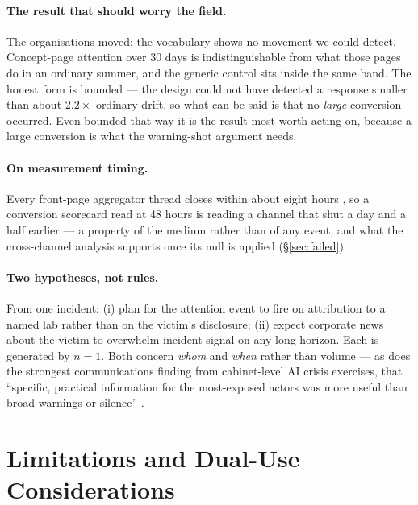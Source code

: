 \documentclass[11pt,a4paper]{article}
\begin{document}
\paragraph{The result that should worry the field.} The organisations moved; the
vocabulary shows no movement we could detect. Concept-page attention over 30
days is indistinguishable from what those pages do in an ordinary summer, and
the generic control sits inside the same band. The honest form is bounded --- the
design could not have detected a response smaller than about $2.2\times$ ordinary
drift, so what can be said is that no \emph{large} conversion occurred. Even
bounded that way it is the result most worth acting on, because a large
conversion is what the warning-shot argument needs.

\paragraph{On measurement timing.} Every front-page aggregator thread closes
within about eight hours \cite{wu2007novelty}, so a conversion scorecard read at
48 hours is reading a channel that shut a day and a half earlier --- a property
of the medium rather than of any event, and what the cross-channel analysis
supports once its null is applied (§\ref{sec:failed}).

\paragraph{Two hypotheses, not rules.} From one incident: (i) plan for the
attention event to fire on attribution to a named lab rather than on the
victim's disclosure; (ii) expect corporate news about the victim to overwhelm
incident signal on any long horizon. Each is generated by $n=1$. Both concern
\emph{whom} and \emph{when} rather than volume --- as does the strongest
communications finding from cabinet-level AI crisis exercises, that ``specific,
practical information for the most-exposed actors was more useful than broad
warnings or silence'' \cite{shamir2026ttx}.

\section{Limitations and Dual-Use Considerations}
\label{sec:limits}
\end{document}
